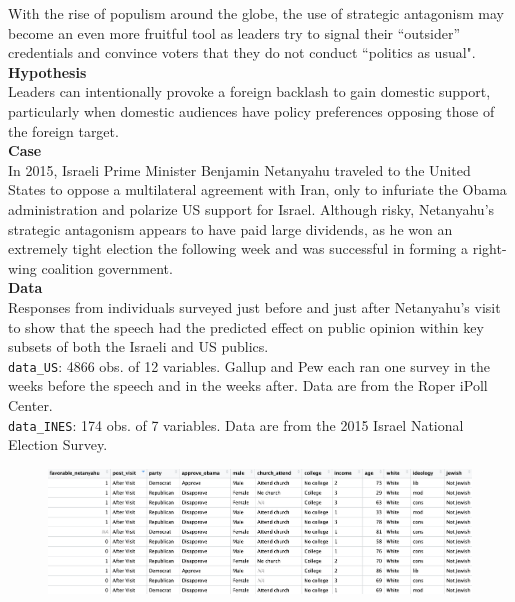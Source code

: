 \documentclass[12pt,letterpaper]{article}
\begin{document}
With the rise of populism around the globe, the use of strategic antagonism may become an even more fruitful tool as leaders try to signal their “outsider” credentials and convince voters that they do not conduct “politics as usual". \\

\textbf{Hypothesis}\\

Leaders can intentionally provoke a foreign backlash to gain domestic support, particularly when domestic audiences have policy preferences opposing those of the foreign target. \\

\textbf{Case}\\

In 2015, Israeli Prime Minister Benjamin Netanyahu traveled to the United States to oppose a multilateral agreement with Iran, only to infuriate the Obama administration and polarize US support for Israel. Although risky, Netanyahu’s strategic antagonism appears to have paid large dividends, as he won an extremely tight election the following week and was successful in forming a right-wing coalition government.\\

\textbf{Data}\\

Responses from individuals surveyed just before and just after Netanyahu’s visit to show that the speech had the predicted effect on public opinion within key subsets of both the Israeli and US publics. \\

\vspace{0.1cm}
\noindent \texttt{data\_US}: 4866 obs. of 12 variables. Gallup and Pew each ran one survey in the weeks before the speech and in the weeks after. Data are from the Roper iPoll Center.\\

\vspace{0.1cm}
\noindent \texttt{data\_INES}: 174 obs. of 7 variables. Data are from the 2015 Israel National Election Survey.
\vspace{0.1cm}
	 
	
	\begin{figure}[H]
	\centering
	\includegraphics[width=1.0\textwidth]{Images/Image1.png}
	\label{fig:your_figure_label} 
\end{figure}
\end{document}
